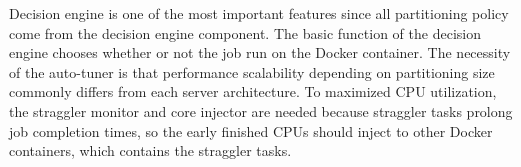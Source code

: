 Decision engine is one of the most important features
since all partitioning policy come from the decision engine component.
The basic function of the decision engine chooses whether or not the job
run on the Docker container.
The necessity of the auto-tuner is that performance scalability depending on partitioning
size commonly differs from each server architecture.
To maximized CPU utilization, the straggler monitor and core injector are needed
because straggler tasks prolong job completion times, so the
early finished CPUs should inject to other Docker containers, which
contains the straggler tasks.
